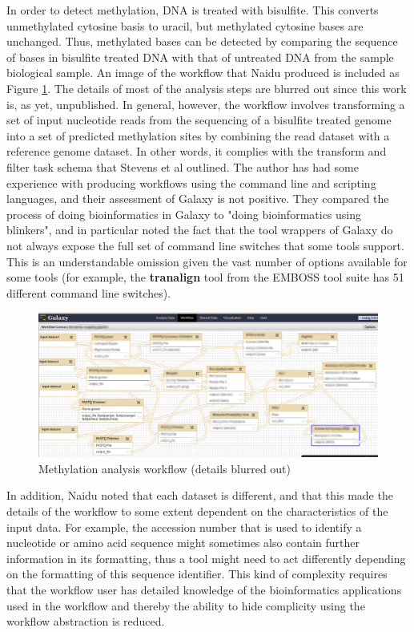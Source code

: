 \documentclass[a4paper,10pt]{scrreprt}
\begin{document}
In order to detect methylation, DNA is treated with bisulfite. This converts unmethylated cytosine basis to uracil, but methylated cytosine bases are unchanged. Thus, methylated bases can be detected by comparing the sequence of bases in bisulfite treated DNA with that of untreated DNA from the sample biological sample. An image of the workflow that Naidu produced is included as Figure \ref{fig:canvasworkflow_blurred}. The details of most of the analysis steps are blurred out since this work is, as yet, unpublished. In general, however, the workflow involves transforming a set of input nucleotide reads from the sequencing of a bisulfite treated genome into a set of predicted methylation sites by combining the read dataset with a reference genome dataset. In other words, it complies with the transform and filter task schema that Stevens et al outlined. The author has had some experience with producing workflows using the command line and scripting languages, and their assessment of Galaxy is not positive. 
They compared the process of doing bioinformatics in Galaxy to "doing bioinformatics using blinkers", and in particular noted the fact that the tool wrappers of Galaxy do not always expose the full set of command line switches that some tools support. This is an understandable omission given the vast number of options available for some tools (for example, the \textbf{tranalign} tool from the EMBOSS tool suite has 51 different command line switches).

\begin{figure}[hbt]
\centering
\includegraphics[width=\textwidth]{images/canvasworkflow_blurred}
\caption{Methylation analysis workflow (details blurred out)}
\label{fig:canvasworkflow_blurred}
\end{figure}

In addition, Naidu noted that each dataset is different, and that this made the details of the workflow to some extent dependent on the characteristics of the input data. For example, the accession number that is used to identify a nucleotide or amino acid sequence might sometimes also contain further information in its formatting, thus a tool might need to act differently depending on the formatting of this sequence identifier. This kind of complexity requires that the workflow user has detailed knowledge of the bioinformatics applications used in the workflow and thereby the ability to hide complicity using the workflow abstraction is reduced.
\end{document}
